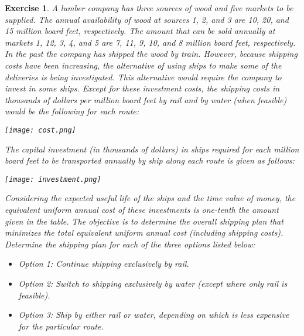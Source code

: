 \documentclass[letterpaper,10pt]{article}
\newtheorem{ex}{Exercise}
\begin{document}
\begin{ex}
A lumber company has three sources of wood and five markets to be supplied. The annual availability of wood at sources 1, 2, and 3 are 10, 20, and 15 million board feet, respectively. The amount that can be sold annually at markets 1, 12, 3, 4, and 5 are 7, 11, 9, 10, and 8 million board feet, respectively.
In the past the company has shipped the wood by train. However, because shipping costs have been increasing, the alternative of using ships to make some of the deliveries is being investigated. This alternative would require the company to invest in some ships. Except for these investment costs, the shipping costs in thousands of dollars per million board feet by rail and by water (when feasible) would be the following for each route:
\begin{center}
\texttt{[image: cost.png]}
\end{center}
The capital investment (in thousands of dollars) in ships required for each million board feet to be transported annually by ship along each route is given as follows:
\begin{center}
\texttt{[image: investment.png]}
\end{center}
Considering the expected useful life of the ships and the time value of money, the equivalent uniform annual cost of these investments is one-tenth the amount given in the table.  The objective is to determine the overall shipping plan that minimizes the total equivalent uniform annual cost (including shipping costs).  Determine the shipping plan for each of the three options listed below:

\begin{itemize}

\item {\em Option 1:} Continue shipping exclusively by rail.

\item {\em Option 2:} Switch to shipping exclusively by water (except where only rail is feasible).

\item {\em Option 3:} Ship by either rail or water, depending on which is less expensive for the particular route.


\end{itemize}



\end{ex}
\end{document}
